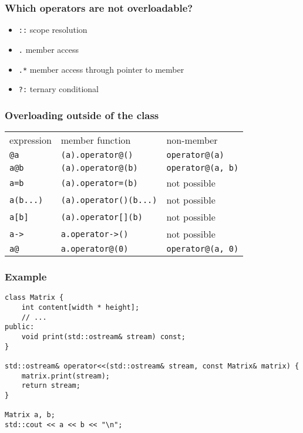 \begin{frame}[fragile]
    \frametitle{Which operators are not overloadable?}
    \begin{itemize}
    \item \lstinline{::} scope resolution
    \item \lstinline{.} member access
    \item \lstinline{.*} member access through pointer to member
    \item \lstinline{?:} ternary conditional
    \end{itemize}
\end{frame}

\begin{frame}[fragile]
    \frametitle{Overloading outside of the class}
    \begin{tabular}{lll}
    \rowcolor{gray!50}
    expression & member function & non-member\\
    {\lstinline!@a!} & {\lstinline!(a).operator@()!} & {\lstinline!operator@(a)!} \\
    \rowcolor{gray!25}
    {\lstinline!a@b!} & {\lstinline!(a).operator@(b)!} & {\lstinline!operator@(a, b)!} \\
    {\lstinline!a=b!} & {\lstinline!(a).operator=(b)!} & \cellcolor{red!15}not possible \\
    \rowcolor{gray!25}
    {\lstinline!a(b...)!} & {\lstinline!(a).operator()(b...)!} & \cellcolor{red!25}not possible \\
    {\lstinline!a[b]!} & {\lstinline!(a).operator[](b)!} & \cellcolor{red!15}not possible \\
    \rowcolor{gray!25}
    {\lstinline!a->!} & {\lstinline!a.operator->()!} & \cellcolor{red!25}not possible \\
    {\lstinline!a@!} & {\lstinline!a.operator@(0)!} & {\lstinline!operator@(a, 0)!} \\
    \end{tabular}
\end{frame}

\begin{frame}[fragile]
    \frametitle{Example}
    \begin{lstlisting}[numbers=none]
class Matrix {
    int content[width * height];
    // ...
public:
    void print(std::ostream& stream) const;
}

std::ostream& operator<<(std::ostream& stream, const Matrix& matrix) {
    matrix.print(stream);
    return stream;
}

Matrix a, b;
std::cout << a << b << "\n";
    \end{lstlisting}
\end{frame}

